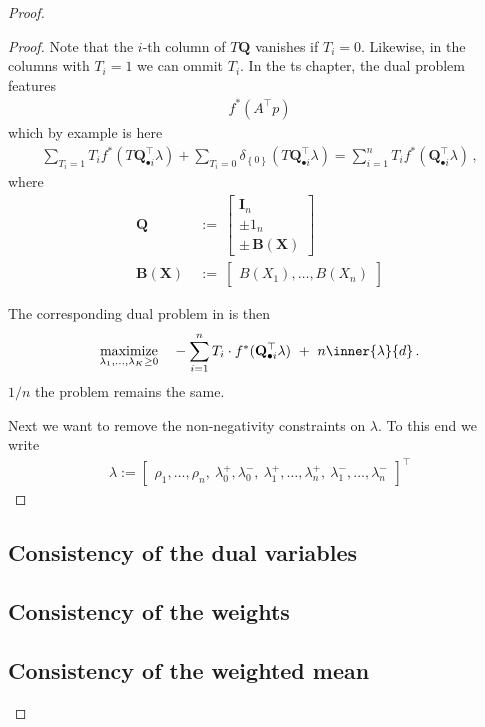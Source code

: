 \begin{proof}
\begin{proof}
Note that the $i$-th column of $T\mathbf{Q}$ vanishes if 
$T_i=0$. Likewise, in the columns with $T_i=1$ we can ommit $T_i$.
In the ts chapter, the dual problem features
\begin{gather}
  f^*(A^\top p)
\end{gather}
which by example is here
\begin{gather*}
  \sum_{T_i=1} T_i f^*(T\mathbf{Q}_{\bullet i}^\top\lambda)
  +
  \sum_{T_i=0} 
  \delta_{\left\{ 0 \right\}}
(T\mathbf{Q}_{\bullet i}^\top\lambda)
  =
  \sum_{i=1}^n T_i f^*(\mathbf{Q}_{\bullet i}^\top\lambda)
  \,,
\end{gather*}
where
\begin{align*}
    \mathbf{Q}
    &
    \ 
    :=
    \ 
    \begin{bmatrix}
      \mathbf{I}_n
      \\
      \pm
      \mathrm{1}_n
      \\
      \pm\,\mathbf{B}(\mathbf{X})
    \end{bmatrix}
    \\
    \mathbf{B}(\mathbf{X})
    &
    \ 
    :=
    \ 
    \begin{bmatrix}
      B(X_1), \ldots, B(X_n)
    \end{bmatrix}
\end{align*}


The corresponding dual problem in \cite{Tseng1991} is then
\begin{gather*}
  \underset
  {\lambda_1,\ldots,\lambda_{K}\ge 0}
  {
  \mathrm{maximize}
  }
  \quad
  -
  \sum_{i=1} 
  ^n
  T_i
  \cdot
  f^*
(\mathbf{Q}_{\bullet i}^\top\lambda)
  \ 
  +
  \ 
  n\inner{\lambda}{d}
  \,.
\end{gather*}
  $1/n$ the problem remains the same.

  Next we want to remove the non-negativity constraints on $\lambda$.
  To this end we write
  \begin{gather}
    \lambda
    :=
    \begin{bmatrix}
      \rho_1,
      \ldots,
      \rho_n,
      \ 
      \lambda_0^+,
      \lambda_0^-,
      \ 
      \lambda_1^+,
      \ldots,
      \lambda_n^+,
      \ 
      \lambda_1^-,
      \ldots,
      \lambda_n^-
    \end{bmatrix}
    ^\top
  \end{gather}
  \end{proof}

\subsection*{Consistency of the dual variables}
\subsection*{Consistency of the weights}
\subsection*{Consistency of the weighted mean}
\end{proof}
